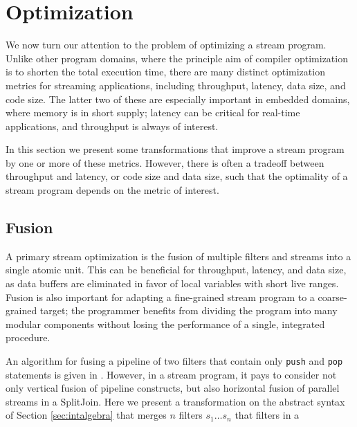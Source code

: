 \section{Optimization}

We now turn our attention to the problem of optimizing a stream
program.  Unlike other program domains, where the principle aim of
compiler optimization is to shorten the total execution time, there
are many distinct optimization metrics for streaming applications,
including throughput, latency, data size, and code size.  The latter
two of these are especially important in embedded domains, where
memory is in short supply; latency can be critical for real-time
applications, and throughput is always of interest.

%

In this section we present some transformations that improve a stream
program by one or more of these metrics.  However, there is often a
tradeoff between throughput and latency, or code size and data size,
such that the optimality of a stream program depends on the metric of
interest.

\subsection{Fusion}

A primary stream optimization is the fusion of multiple filters and
streams into a single atomic unit.  This can be beneficial for
throughput, latency, and data size, as data buffers are eliminated in
favor of local variables with short live ranges.  Fusion is also
important for adapting a fine-grained stream program to a
coarse-grained target; the programmer benefits from dividing the
program into many modular components without losing the performance of
a single, integrated procedure.

An algorithm for fusing a pipeline of two filters that contain only
{\tt push} and {\tt pop} statements is given in \cite{pro96}.
However, in a stream program, it pays to consider not only vertical
fusion of pipeline constructs, but also horizontal fusion of parallel
streams in a SplitJoin.  Here we present a transformation on the
abstract syntax of Section \ref{sec:intalgebra} that merges $n$
filters $s_1 \dots s_n$ that 
filters in a 


